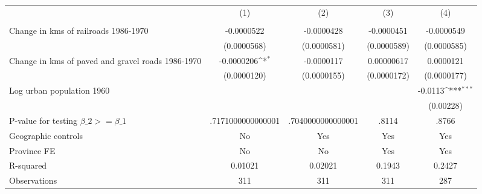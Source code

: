 {
\def\sym#1{\ifmmode^{#1}\else\(^{#1}\)\fi}
\begin{tabular}{l*{4}{c}}
\hline\hline
                &\multicolumn{1}{c}{(1)}&\multicolumn{1}{c}{(2)}&\multicolumn{1}{c}{(3)}&\multicolumn{1}{c}{(4)}\\
                &\multicolumn{1}{c}{}&\multicolumn{1}{c}{}&\multicolumn{1}{c}{}&\multicolumn{1}{c}{}\\
\hline
Change in kms of railroads 1986-1970&-0.0000522         &-0.0000428         &-0.0000451         &-0.0000549         \\
                &(0.0000568)         &(0.0000581)         &(0.0000589)         &(0.0000585)         \\
[1em]
Change in kms of paved and gravel roads 1986-1970&-0.0000206\sym{*}  &-0.0000117         &0.00000617         &0.0000121         \\
                &(0.0000120)         &(0.0000155)         &(0.0000172)         &(0.0000177)         \\
[1em]
Log urban population 1960&                  &                  &                  &  -0.0113\sym{***}\\
                &                  &                  &                  &(0.00228)         \\
\hline
P-value for testing $\beta\_{2} >= \beta\_{1}$&.7171000000000001         &.7040000000000001         &    .8114         &    .8766         \\
Geographic controls&       No         &      Yes         &      Yes         &      Yes         \\
Province FE     &       No         &       No         &      Yes         &      Yes         \\
R-squared       &  0.01021         &  0.02021         &   0.1943         &   0.2427         \\
Observations    &      311         &      311         &      311         &      287         \\
\hline\hline
\end{tabular}
}
